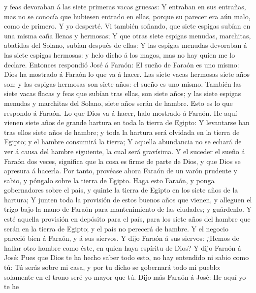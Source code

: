y feas devoraban á las siete primeras vacas gruesas:  Y
entraban en sus entrañas, mas no se conocía que hubiesen entrado en
ellas, porque su parecer era aún malo, como de primero. Y yo desperté.
 Vi también soñando, que siete espigas subían en una
misma caña llenas y hermosas;  Y que otras siete espigas
menudas, marchitas, abatidas del Solano, subían después de ellas:
 Y las espigas menudas devoraban á las siete espigas
hermosas: y helo dicho á los magos, mas no hay quien me lo declare.
 Entonces respondió José á Faraón: El sueño de Faraón es
uno mismo: Dios ha mostrado á Faraón lo que va á hacer. 
Las siete vacas hermosas siete años son; y las espigas hermosas son
siete años: el sueño es uno mismo.  También las siete
vacas flacas y feas que subían tras ellas, son siete años; y las siete
espigas menudas y marchitas del Solano, siete años serán de hambre.
 Esto es lo que respondo á Faraón. Lo que Dios va á
hacer, halo mostrado á Faraón.  He aquí vienen siete años
de grande hartura en toda la tierra de Egipto:  Y
levantarse han tras ellos siete años de hambre; y toda la hartura será
olvidada en la tierra de Egipto; y el hambre consumirá la tierra;
 Y aquella abundancia no se echará de ver á causa del
hambre siguiente, la cual será gravísima.  Y el suceder
el sueño á Faraón dos veces, significa que la cosa es firme de parte de
Dios, y que Dios se apresura á hacerla.  Por tanto,
provéase ahora Faraón de un varón prudente y sabio, y póngalo sobre la
tierra de Egipto.  Haga esto Faraón, y ponga gobernadores
sobre el país, y quinte la tierra de Egipto en los siete años de la
hartura;  Y junten toda la provisión de estos buenos años
que vienen, y alleguen el trigo bajo la mano de Faraón para
mantenimiento de las ciudades; y guárdenlo.  Y esté
aquella provisión en depósito para el país, para los siete años del
hambre que serán en la tierra de Egipto; y el país no perecerá de
hambre.  Y el negocio pareció bien á Faraón, y á sus
siervos.  Y dijo Faraón á sus siervos: ¿Hemos de hallar
otro hombre como éste, en quien haya espíritu de Dios?  Y
dijo Faraón á José: Pues que Dios te ha hecho saber todo esto, no hay
entendido ni sabio como tú:  Tú serás sobre mi casa, y
por tu dicho se gobernará todo mi pueblo: solamente en el trono seré yo
mayor que tú.  Dijo más Faraón á José: He aquí yo te he
